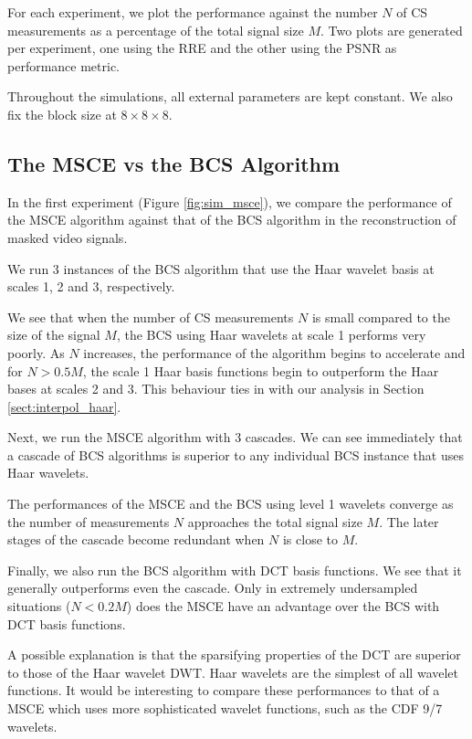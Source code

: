 For each experiment, we plot the performance against the number $N$ of CS measurements as a percentage of the total signal size $M$.
Two plots are generated per experiment, one using the RRE and the other using the PSNR as performance metric.

Throughout the simulations, all external parameters are kept constant.
We also fix the block size at $8\times 8\times 8$.

\subsection{The MSCE vs the BCS Algorithm }
In the first experiment (Figure \ref{fig:sim_msce}), we compare the performance of the MSCE algorithm against that of the BCS algorithm in the reconstruction of masked video signals.

We run 3 instances of the BCS algorithm that use the Haar wavelet basis at scales 1, 2 and 3, respectively.

We see that when the number of CS measurements $N$ is small compared to the size of the signal $M$, the BCS using Haar wavelets at scale 1 performs very poorly.
As $N$ increases, the performance of the algorithm begins to accelerate and for $N > 0.5M$, the scale 1 Haar basis functions begin to outperform the Haar bases at scales 2 and 3. 
This behaviour ties in with our analysis in Section \ref{sect:interpol_haar}.

Next, we run the MSCE algorithm with 3 cascades.
We can see immediately that a cascade of BCS algorithms is superior to any individual BCS instance that uses Haar wavelets.

The performances of the MSCE and the BCS using level 1 wavelets converge as the number of measurements $N$ approaches the total signal size $M$.
The later stages of the cascade become redundant when $N$ is close to $M$.

Finally, we also run the BCS algorithm with DCT basis functions.
We see that it generally outperforms even the cascade.
Only in extremely undersampled situations ($N<0.2M$) does the MSCE have an advantage over the BCS with DCT basis functions.

A possible explanation is that the sparsifying properties of the DCT are superior to those of the Haar wavelet DWT.
Haar wavelets are the simplest of all wavelet functions.
It would be interesting to compare these performances to that of a MSCE which uses more sophisticated wavelet functions, such as the CDF 9/7 wavelets.


